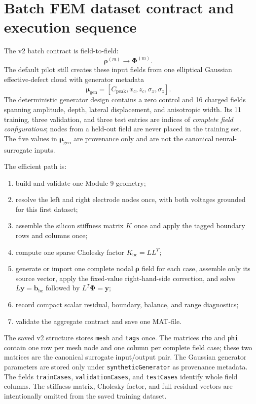 \documentclass[11pt]{article}
\newcommand{\phivec}{\bm{\Phi}}
\begin{document}
\section{Batch FEM dataset contract and execution sequence}

The v2 batch contract is field-to-field:
\begin{equation}
\boxed{\bm{\rho}^{(m)}\longrightarrow\bm{\Phi}^{(m)}}.
\end{equation}
The default pilot still creates these input fields from one elliptical Gaussian effective-defect cloud with generator metadata
\begin{equation}
\bm{\mu}_{\mathrm{gen}}=\left[C_{\mathrm{peak}},x_c,z_c,\sigma_x,\sigma_z\right].
\end{equation}
The deterministic generator design contains a zero control and 16 charged fields spanning amplitude, depth, lateral displacement, and anisotropic width. Its 11 training, three validation, and three test entries are indices of \emph{complete field configurations}; nodes from a held-out field are never placed in the training set. The five values in $\bm{\mu}_{\mathrm{gen}}$ are provenance only and are not the canonical neural-surrogate inputs.

The efficient path is:
\begin{enumerate}[leftmargin=*]
  \item build and validate one Module 9 geometry;
  \item resolve the left and right electrode nodes once, with both voltages grounded for this first dataset;
  \item assemble the silicon stiffness matrix $K$ once and apply the tagged boundary rows and columns once;
  \item compute one sparse Cholesky factor $K_{\mathrm{bc}}=LL^T$;
  \item generate or import one complete nodal $\bm{\rho}$ field for each case, assemble only its source vector, apply the fixed-value right-hand-side correction, and solve $L\mathbf{y}=\mathbf{b}_{\mathrm{bc}}$ followed by $L^T\phivec=\mathbf{y}$;
  \item record compact scalar residual, boundary, balance, and range diagnostics;
  \item validate the aggregate contract and save one MAT-file.
\end{enumerate}

The saved v2 structure stores \texttt{mesh} and \texttt{tags} once. The matrices \texttt{rho} and \texttt{phi} contain one row per mesh node and one column per complete field case; these two matrices are the canonical surrogate input/output pair. The Gaussian generator parameters are stored only under \texttt{syntheticGenerator} as provenance metadata. The fields \texttt{trainCases}, \texttt{validationCases}, and \texttt{testCases} identify whole field columns. The stiffness matrix, Cholesky factor, and full residual vectors are intentionally omitted from the saved training dataset.
\end{document}
